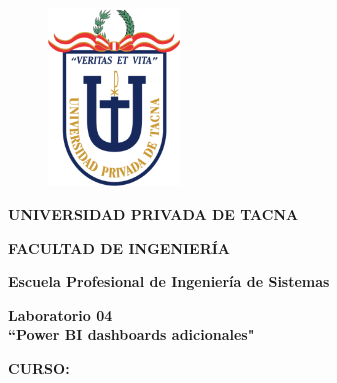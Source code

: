 \documentclass[12pt,letterpaper]{article}
\begin{document}
    \begin{titlepage}
        \begin{center}
            \begin{figure}[htb]
                \begin{center}
                    \includegraphics[width=3.5cm]{./img/logo}
                \end{center}
            \end{figure}
            \vspace*{0.15in}
            \begin{Large}
                \textbf{UNIVERSIDAD PRIVADA DE TACNA}\\
            \end{Large}
            \vspace*{0.15in}
            \begin{Large}
                \textbf{FACULTAD DE INGENIERÍA} \\
            \end{Large}
            \vspace*{0.1in}
            \begin{Large}
                \textbf{Escuela Profesional de Ingeniería de Sistemas} \\
            \end{Large}
            \vspace*{0.3in}
            \begin{Large}
                \textbf{Laboratorio 04}\\
                \textbf{``Power BI dashboards adicionales"}\\
            \end{Large}
            \vspace*{0.2in}
            \begin{Large}
                \textbf{CURSO:} \\
            \end{Large}
            \vspace*{0.1in}
            \begin{large}

\end{large}
\end{center}
\end{titlepage}
\end{document}
